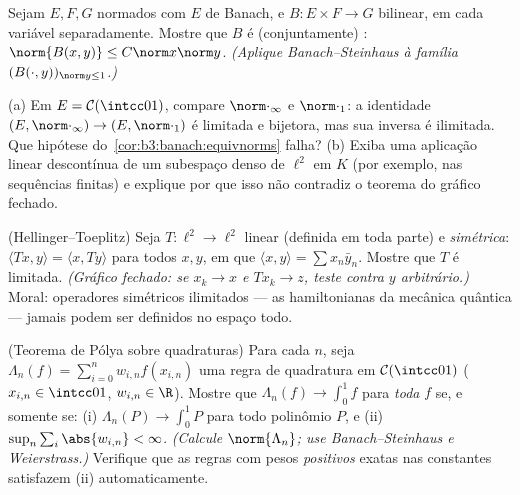 \begin{exercise}[$\star\star$]\label{exo:b3:banach:6}
Sejam $E, F, G$ normados com $E$ de Banach, e $B \colon E \times
F \to G$ bilinear, 
em cada variável separadamente. Mostre que $B$ é (conjuntamente)
: $\norm{B(x,y)} \leq
C\norm x\norm y$. \emph{(Aplique Banach--Steinhaus à família $(B(\cdot, y))_{\norm y \leq 1}$.)}
\end{exercise}

\begin{exercise}[$\star\star$]\label{exo:b3:banach:7}
(a) Em $E = \mathcal C(\intcc01)$, compare $\norm\cdot_\infty$ e $\norm\cdot_1$: a identidade $(E, \norm\cdot_\infty) \to
(E, \norm\cdot_1)$ é limitada e
bijetora, mas sua inversa é ilimitada. Que hipótese do~\cref{cor:b3:banach:equivnorms}
falha?
(b) Exiba uma aplicação linear descontínua de um subespaço denso de
$\ell^2$ em $K$ (por exemplo, nas sequências finitas) e explique
por que isso não contradiz o teorema do gráfico fechado.
\end{exercise}

\begin{exercise}[$\star\star\star$]\label{exo:b3:banach:8}
(Hellinger--Toeplitz) Seja $T \colon \ell^2 \to \ell^2$ linear (definida em toda parte) e
\emph{simétrica}: $\langle Tx,
y\rangle = \langle x, Ty\rangle$ para todos $x, y$, em que $\langle
x, y \rangle = \sum x_n\bar y_n$. Mostre que
$T$ é limitada. \emph{(Gráfico fechado: se $x_k \to x$ e $Tx_k \to z$, teste
contra $y$ arbitrário.)} Moral: operadores simétricos ilimitados ---
as hamiltonianas da mecânica quântica --- jamais podem ser definidos no
espaço todo.
\end{exercise}

\begin{exercise}[$\star\star\star$]\label{exo:b3:banach:9}
(Teorema de Pólya sobre quadraturas) Para cada $n$, seja $\Lambda_n(f)
= \sum_{i=0}^{n} w_{i,n}f(x_{i,n})$ uma
regra de quadratura em $\mathcal C(\intcc01)$ ($x_{i,n} \in \intcc01$, $w_{i,n} \in
\R$). Mostre que $\Lambda_n(f) \to \int_0^1f$ para
\emph{toda} $f$  se, e somente se: (i) $\Lambda_n(P) \to \int_0^1P$ para todo
polinômio $P$, e (ii) $\sup_n\sum_i\abs{w_{i,n}} <
\infty$. \emph{(Calcule $\norm{\Lambda_n}$; use
Banach--Steinhaus e Weierstrass.)} Verifique que as regras com pesos
\emph{positivos} exatas nas constantes satisfazem (ii)
automaticamente.
\end{exercise}

